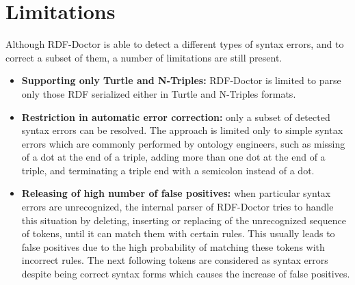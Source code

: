 

\section{Limitations}
Although RDF-Doctor is able to detect a different types of syntax errors, and to correct a subset of them, a number of limitations are still present. 
\begin{itemize}

    \item \textbf{Supporting only Turtle and N-Triples:} RDF-Doctor is limited to parse only those RDF serialized either in Turtle and N-Triples formats. 
    \item \textbf{Restriction in automatic error correction:} only a subset of  detected syntax errors can be resolved. 
    The approach is limited only to simple syntax errors which are commonly performed by ontology engineers, such as missing of a dot at the end of a triple, adding more than one dot at the end of a triple, and terminating a triple end with a semicolon instead of a dot.   

    \item \textbf{Releasing of high number of false positives:} when particular syntax errors are unrecognized, the internal parser of RDF-Doctor tries to handle this situation by deleting, inserting or replacing of the unrecognized sequence of tokens, until it can match them with certain rules.
    This usually leads to false positives due to the high probability of matching these tokens with incorrect rules.
    The next following tokens are considered as syntax errors despite being correct syntax forms which causes the increase of false positives.  

\end{itemize}


